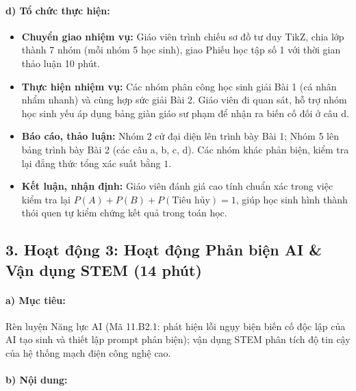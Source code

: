 \documentclass[12pt, a4paper]{article}
\begin{document}
\paragraph{d) Tổ chức thực hiện:}
\begin{itemize}[leftmargin=0.8cm]
    \item \textbf{Chuyển giao nhiệm vụ:} Giáo viên trình chiếu sơ đồ tư duy TikZ, chia lớp thành 7 nhóm (mỗi nhóm 5 học sinh), giao Phiếu học tập số 1 với thời gian thảo luận 10 phút.
    \item \textbf{Thực hiện nhiệm vụ:} Các nhóm phân công học sinh giải Bài 1 (cá nhân nhẩm nhanh) và cùng hợp sức giải Bài 2. Giáo viên đi quan sát, hỗ trợ nhóm học sinh yếu áp dụng bảng giàn giáo sư phạm để nhận ra biến cố đối ở câu d.
    \item \textbf{Báo cáo, thảo luận:} Nhóm 2 cử đại diện lên trình bày Bài 1; Nhóm 5 lên bảng trình bày Bài 2 (các câu a, b, c, d). Các nhóm khác phản biện, kiểm tra lại đẳng thức tổng xác suất bằng $1$.
    \item \textbf{Kết luận, nhận định:} Giáo viên đánh giá cao tính chuẩn xác trong việc kiểm tra lại $P(A) + P(B) + P(\text{Tiêu hủy}) = 1$, giúp học sinh hình thành thói quen tự kiểm chứng kết quả trong toán học.
\end{itemize}

\subsection*{3. Hoạt động 3: Hoạt động Phản biện AI \& Vận dụng STEM (14 phút)}

\paragraph{a) Mục tiêu:} Rèn luyện Năng lực AI (Mã 11.B2.1: phát hiện lỗi ngụy biện biến cố độc lập của AI tạo sinh và thiết lập prompt phản biện); vận dụng STEM phân tích độ tin cậy của hệ thống mạch điện công nghệ cao.

\paragraph{b) Nội dung:}
\end{document}
